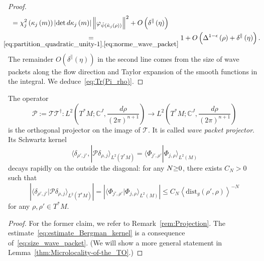 \documentclass[AHL,Unicode,longabstracts,published]{cedram}
\newcommand{\clT}{\mathcal{T}}
\newcommand{\clP}{\mathcal{P}}
\newcommand{\dist}{\mathrm{dist}}
\newcommand{\bbC}{\mathbb{C}}
\let\oldtilde\tilde
\renewcommand*{\tilde}[1]{\mathchoice{\widetilde{#1}}{\widetilde{#1}}{\oldtilde{#1}}{\oldtilde{#1}}}
\begin{document}
\begin{proof}
\begin{align*}
& \mkern6mu= \chi_{j}^{2}\left(\kappa_{j}\left(m\right)\right)\left|\det d\kappa_{j}\left(m\right)\right|\left\Vert \varphi_{\tilde{\psi}\left(\tilde{\kappa}_{j}\left(\rho\right)\right)}\right\Vert ^{2}+O\left(\delta^{\parallel}\left(\eta\right)\right)\\
& \mkern-18mu\underset{\eqref{eq:partition_quadratic_unity-1},\eqref{eq:norme_wave_packet}}{=} 1+O\left(\Delta^{1-\epsilon}\left(\rho\right)+\delta^{\parallel}\left(\eta\right)\right).
\end{align*}
The remainder $O(\delta^{\parallel}(\eta))$ in the second line comes from the size of wave packets along the flow direction and Taylor expansion of the smooth functions in the integral. We deduce~\eqref{eq:Tr(Pi_rho)}.
\end{proof}

\begin{cBoxB}{}
\begin{prop}\label{lem:Bargmann projector}
The operator
\begin{equation}\label{eq:BargmannProjector}
\clP :=\clT\clT^{\dagger}:L^{2}\left(T^{*}M;\bbC^{J},\frac{d\rho}{\left(2\pi\right)^{n+1}}\right)\rightarrow L^{2}\left(T^{*}M;\bbC^{J},\frac{d\rho}{\left(2\pi\right)^{n+1}}\right)
\end{equation}
is the orthogonal projector on the image of $\clT$. It is called \emph{wave packet projector}. Its Schwartz kernel
\begin{equation}\label{eq:kernel_T_T*}
\langle\delta_{\rho',j'},|\clP \delta_{\rho,j}\rangle_{L^{2}\left(T^{*}M\right)}=\langle\Phi_{j',\rho'}|\Phi_{j,\rho}\rangle_{L^{2}\left(M\right)}
\end{equation}
decays rapidly on the outside the diagonal: for any $N\text{\ensuremath{\ge}0}$, there exists $C_{N}>0$ such that
\begin{equation}\label{eq:estimate_Bergman_kernel}
\left|\langle\delta_{\rho',j'}|\clP \delta_{\rho,j}\rangle_{L^{2}\left(T^{*}M\right)}\right|=\left|\langle\Phi_{j',\rho'}|\Phi_{j,\rho}\rangle_{L^{2}\left(M\right)}\right|\leq C_{N}\left\langle \dist_{g}\left(\rho',\rho\right)\right\rangle ^{-N}
\end{equation}
for any $\rho,\rho'\in T^{*}M$.
\end{prop}
\end{cBoxB}

\begin{proof}
For the former claim, we refer to Remark~\ref{rem:Projection}. The estimate~\eqref{eq:estimate_Bergman_kernel} is a consequence of~\eqref{eq:size_wave_packet}. (We will show a more general statement in Lemma~\ref{thm:Microlocality-of-the_TO}.)
\end{proof}
\end{document}
